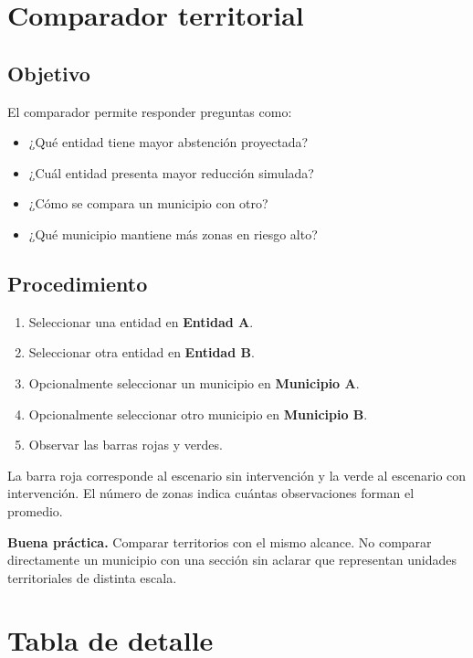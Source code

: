 \documentclass[11pt,a4paper]{article}
\begin{document}
\section{Comparador territorial}

\subsection{Objetivo}

El comparador permite responder preguntas como:

\begin{itemize}
    \item ¿Qué entidad tiene mayor abstención proyectada?
    \item ¿Cuál entidad presenta mayor reducción simulada?
    \item ¿Cómo se compara un municipio con otro?
    \item ¿Qué municipio mantiene más zonas en riesgo alto?
\end{itemize}

\subsection{Procedimiento}

\begin{enumerate}
    \item Seleccionar una entidad en \textbf{Entidad A}.
    \item Seleccionar otra entidad en \textbf{Entidad B}.
    \item Opcionalmente seleccionar un municipio en \textbf{Municipio A}.
    \item Opcionalmente seleccionar otro municipio en \textbf{Municipio B}.
    \item Observar las barras rojas y verdes.
\end{enumerate}

La barra roja corresponde al escenario sin intervención y la verde al escenario con intervención. El número de zonas indica cuántas observaciones forman el promedio.

\begin{resultado}
\textbf{Buena práctica.} Comparar territorios con el mismo alcance. No comparar directamente un municipio con una sección sin aclarar que representan unidades territoriales de distinta escala.
\end{resultado}

\section{Tabla de detalle}
\end{document}
